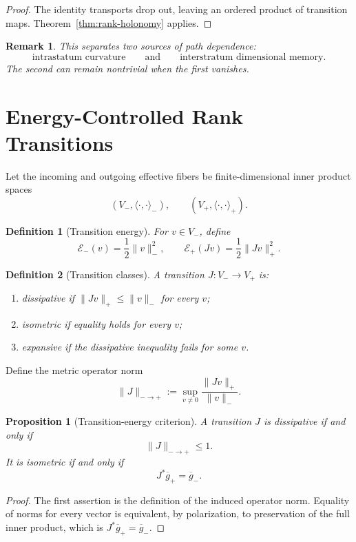 \documentclass[11pt]{article}
\newtheorem{definition}{Definition}[section]
\newtheorem{proposition}{Proposition}[section]
\newtheorem{remark}{Remark}[section]
\begin{document}
\begin{proof}
The identity transports drop out, leaving an ordered product of transition
maps. Theorem~\ref{thm:rank-holonomy} applies.
\end{proof}

\begin{remark}
This separates two sources of path dependence:
\[
\text{intrastatum curvature}
\qquad\text{and}\qquad
\text{interstratum dimensional memory}.
\]
The second can remain nontrivial when the first vanishes.
\end{remark}

\section{Energy-Controlled Rank Transitions}
\label{sec:energy}

Let the incoming and outgoing effective fibers be finite-dimensional inner
product spaces
\[
(V_-,\langle\cdot,\cdot\rangle_-),
\qquad
(V_+,\langle\cdot,\cdot\rangle_+).
\]

\begin{definition}[Transition energy]
For $v\in V_-$, define
\[
\mathcal E_-(v)=\frac12\|v\|_-^2,
\qquad
\mathcal E_+(Jv)=\frac12\|Jv\|_+^2.
\]
\end{definition}

\begin{definition}[Transition classes]
A transition $J:V_-\to V_+$ is:
\begin{enumerate}[label=(\roman*)]
\item \emph{dissipative} if $\|Jv\|_+\le\|v\|_-$ for every $v$;
\item \emph{isometric} if equality holds for every $v$;
\item \emph{expansive} if the dissipative inequality fails for some $v$.
\end{enumerate}
\end{definition}

Define the metric operator norm
\[
\|J\|_{-\to+}:=
\sup_{v\ne0}\frac{\|Jv\|_+}{\|v\|_-}.
\]

\begin{proposition}[Transition-energy criterion]
A transition $J$ is dissipative if and only if
\[
\|J\|_{-\to+}\le1.
\]
It is isometric if and only if
\[
J^*\overline g_+=\overline g_-.
\]
\end{proposition}

\begin{proof}
The first assertion is the definition of the induced operator norm. Equality
of norms for every vector is equivalent, by polarization, to preservation of
the full inner product, which is $J^*\overline g_+=\overline g_-$.
\end{proof}
\end{document}
